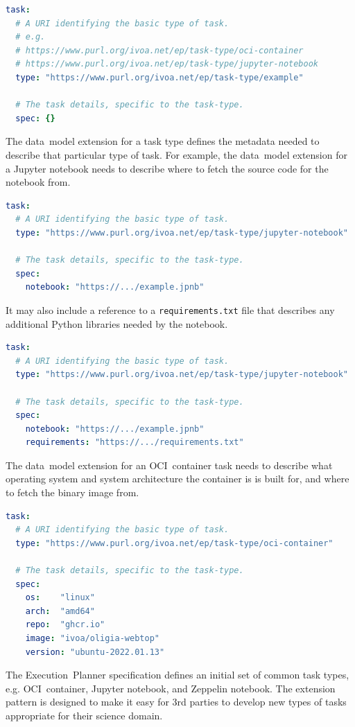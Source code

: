 \documentclass[11pt,a4paper]{ivoa}
\newcommand{\datamodel} {data~model}
\newcommand{\executionplanner} {Execution~Planner}
\newcommand{\jupyter} {Jupyter}
\newcommand{\python} {Python}
\newcommand{\zeppelin} {Zeppelin}
\newcommand{\ocicontainer} {OCI~container}
\newcommand{\codeword}[1] {\texttt{#1}}
\begin{document}
\begin{lstlisting}[language=yaml]
task:
  # A URI identifying the basic type of task.
  # e.g.
  # https://www.purl.org/ivoa.net/ep/task-type/oci-container
  # https://www.purl.org/ivoa.net/ep/task-type/jupyter-notebook
  type: "https://www.purl.org/ivoa.net/ep/task-type/example"

  # The task details, specific to the task-type.
  spec: {}
\end{lstlisting}

The \datamodel{} extension for a task type defines the metadata needed to describe that particular type of task.
For example, the \datamodel{} extension for a \jupyter{} notebook needs to describe where to fetch the source code for the notebook from.
\begin{lstlisting}[language=yaml]
task:
  # A URI identifying the basic type of task.
  type: "https://www.purl.org/ivoa.net/ep/task-type/jupyter-notebook"

  # The task details, specific to the task-type.
  spec:
    notebook: "https://.../example.jpnb"
\end{lstlisting}

It may also include a reference to a \codeword{requirements.txt} file that describes any additional \python{}
libraries needed by the notebook.
\begin{lstlisting}[language=yaml]
task:
  # A URI identifying the basic type of task.
  type: "https://www.purl.org/ivoa.net/ep/task-type/jupyter-notebook"

  # The task details, specific to the task-type.
  spec:
    notebook: "https://.../example.jpnb"
    requirements: "https://.../requirements.txt"
\end{lstlisting}

The \datamodel{} extension for an \ocicontainer{} task needs to describe what operating system and system architecture
the container is is built for, and where to fetch the binary image from.

\begin{lstlisting}[language=yaml]
task:
  # A URI identifying the basic type of task.
  type: "https://www.purl.org/ivoa.net/ep/task-type/oci-container"

  # The task details, specific to the task-type.
  spec:
    os:    "linux"
    arch:  "amd64"
    repo:  "ghcr.io"
    image: "ivoa/oligia-webtop"
    version: "ubuntu-2022.01.13"
\end{lstlisting}

The \executionplanner{} specification defines an initial set of common task types, e.g. \ocicontainer{}, \jupyter{} notebook,
and \zeppelin{} notebook.
The extension pattern is designed to make it easy for 3rd parties to develop new types of tasks appropriate for their science domain.
\end{document}
